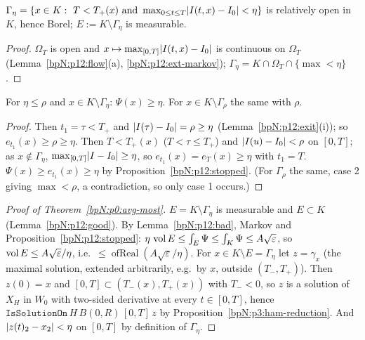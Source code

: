 \begin{lemma}\label{bpN:p12:good}
$\Gamma_\eta=\{x\in K:\ T<T_+(x)\ \text{and}\ \max_{0\le t\le T}\abs{I(t,x)-I_0}<\eta\}$ is relatively open in $K$, hence Borel; $E:=K\setminus\Gamma_\eta$ is measurable.
\end{lemma}
\begin{proof}
$\Omega_T$ is open and $x\mapsto\max_{[0,T]}\lvert I(t,x)-I_0\rvert$ is continuous on $\Omega_T$ (Lemma~\ref{bpN:p12:flow}(a), \ref{bpN:p12:ext-markov}); $\Gamma_\eta=K\cap\Omega_T\cap\{\max<\eta\}$.
\end{proof}

\begin{lemma}\label{bpN:p12:bad}
For $\eta\le\rho$ and $x\in K\setminus\Gamma_\eta$: $\Psi(x)\ge\eta$. For $x\in K\setminus\Gamma_\rho$ the same with $\rho$.
\end{lemma}
\begin{proof}
\label{stepN:p12:bd-exit} Then $t_1=\tau<T_+$ and $\lvert I(\tau)-I_0\rvert=\rho\ge\eta$ (Lemma~\ref{bpN:p12:exit}(i)); so $e_{t_1}(x)\ge\rho\ge\eta$.
\label{stepN:p12:bd-stay} Then $T<T_+(x)$ ($T<\tau\le T_+$) and $\lvert I(u)-I_0\rvert<\rho$ on $[0,T]$; as $x\notin\Gamma_\eta$, $\max_{[0,T]}\lvert I-I_0\rvert\ge\eta$, so $e_{t_1}(x)=e_T(x)\ge\eta$ with $t_1=T$.
\label{stepN:p12:bd-concl} $\Psi(x)\ge e_{t_1}(x)\ge\eta$ by Proposition~\ref{bpN:p12:stopped}. (For $\Gamma_\rho$ the same, case 2 giving $\max<\rho$, a contradiction, so only case 1 occurs.)
\end{proof}

\begin{proof}[Proof of Theorem~\ref{bpN:p0:avg-most}]
\label{stepN:p12:mo-E} $E=K\setminus\Gamma_\eta$ is measurable and $E\subset K$ (Lemma~\ref{bpN:p12:good}). By Lemma~\ref{bpN:p12:bad}, Markov and Proposition~\ref{bpN:p12:stopped}: $\eta\,\operatorname{vol} E\le\int_E\Psi\le\int_K\Psi\le A\sqrt\varepsilon$, so $\operatorname{vol} E\le A\sqrt\varepsilon/\eta$, i.e.\ $\le\operatorname{ofReal}(A\sqrt\varepsilon/\eta)$.
\label{stepN:p12:mo-z} For $x\in K\setminus E=\Gamma_\eta$ let $z=\gamma_x$ (the maximal solution, extended arbitrarily, e.g.\ by $x$, outside $(T_-,T_+)$). Then $z(0)=x$ and $[0,T]\subset(T_-(x),T_+(x))$ with $T_-<0$, so $z$ is a solution of $X_H$ in $W_0$ with two-sided derivative at every $t\in[0,T]$, hence $\texttt{IsSolutionOn}\,H\,B(0,R)\,[0,T]\,z$ by Proposition~\ref{bpN:p3:ham-reduction}. And $\lvert z(t)_2-x_2\rvert<\eta$ on $[0,T]$ by definition of $\Gamma_\eta$.
\end{proof}

